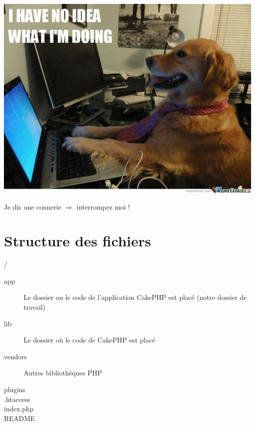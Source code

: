 

\begin{frame}
\begin{center}
\includegraphics[scale=0.40]{img/noidea.jpg}

Je dis une connerie $\Rightarrow$ interrompez moi !
\end{center}
\end{frame}

\section{Structure des fichiers}

\begin{frame}{/}
\begin{description}
  \item [app] Le dossier ou le code de l'application CakePHP est placé (notre dossier de travail)
  \item [lib] Le dossier où le code de CakePHP est placé
  \item [vendors] Autres bibliothèques PHP
  \item [plugins]
  \item [.htaccess]
  \item [index.php]
  \item [README]
\end{description}
\end{frame}

